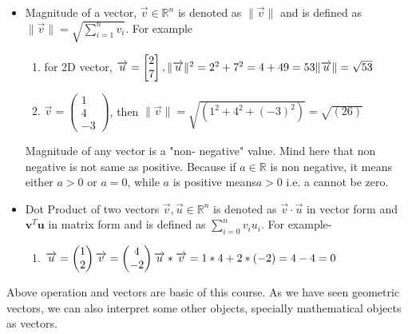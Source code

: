\documentclass{article}
\begin{document}
\begin{itemize}
\item Magnitude of a vector, $\overrightarrow{v}\in\mathbb{R}^n$ is denoted as
$\|\overrightarrow{v}\|$ and  is  defined as $\|{\overrightarrow{v}\|} =  \sqrt{\sum_{i=1}^{n} {v_i}}$. For example
    \begin{enumerate}
        \item for 2D vector, $\overrightarrow{u} = \begin{bmatrix} 2\\7\\ \end{bmatrix},  \|{\overrightarrow{u}\|^2} = 2^2+7^2=4+49=53\\\|{\overrightarrow{u}\|} = \sqrt{53}$
        \item $\overrightarrow{v}=\begin{pmatrix}1\\4\\-3\end{pmatrix}$, then     $\|\overrightarrow{v}\|=\sqrt{(1^2+4^2+(-3)^2)} = \sqrt{(26)}$ 
    \end{enumerate}

Magnitude of  any vector is a "non- negative" value. Mind here that non negative is not same as positive. Because if $a\in\mathbb{R}$ is non negative, it means either $a>0$ or $a=0$, while $a$ is positive means$a>0$ i.e. a cannot  be zero. 

\item Dot  Product of two  vectors $\overrightarrow{v},\overrightarrow{u}\in\mathbb{R}^n$ is denoted as $\overrightarrow{v}\cdot\overrightarrow{u}$ in vector form and $\boldsymbol{v}^T\boldsymbol{u}$ in matrix form and is defined as $\sum_{i=0}^{n} {v_iu_i}$. For example-
\begin{enumerate}
    \item $\overrightarrow{u}= \begin{pmatrix}1\\2 \end{pmatrix} \overrightarrow{v}=\begin{pmatrix} 4\\-2 \end{pmatrix}\\\overrightarrow{u}*\overrightarrow{v}= 1*4+2*(-2)=4-4=0$
\end{enumerate}
\end{itemize}
Above operation and vectors are basic of  this course. As we have seen geometric vectors, we can also interpret some other objects, specially mathematical objects as vectors. 
\end{document}
